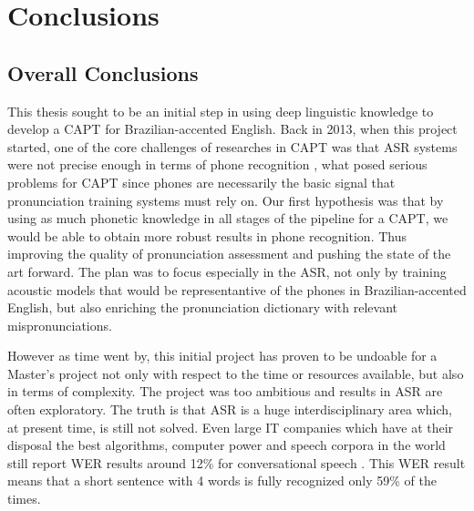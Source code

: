\chapter{Conclusions}\label{ch:conclusions}

\section*{Overall Conclusions}\label{sec:overall-conclusions}

This thesis sought to be an initial step in using deep linguistic knowledge to develop a \ac{CAPT} for Brazilian-accented English. Back in 2013, when this project started, one of the core challenges of researches in \ac{CAPT} was that \ac{ASR} systems were not precise enough in terms of phone recognition \cite{Witt2012}, what posed serious problems for \ac{CAPT} since phones are necessarily the basic signal that pronunciation training systems must rely on. Our first hypothesis was that by using as much phonetic knowledge in all stages of the pipeline for a \ac{CAPT}, we would be able to obtain more robust results in  phone recognition. Thus improving the quality of pronunciation assessment and pushing the state of the art forward. The plan was to focus especially in the \ac{ASR}, not only by training acoustic models that would be representantive of the phones in Brazilian-accented English, but also enriching the pronunciation dictionary with relevant mispronunciations. 

However as time went by, this initial project has proven to be undoable for a Master's project not only with respect to the time or resources available, but also in terms of complexity. The project was too ambitious and results in \ac{ASR} are often exploratory. The truth is that \ac{ASR} is a huge interdisciplinary area which, at present time, is still not solved. Even large IT companies which have at their disposal the best algorithms, computer power and speech corpora in the world still report \ac{WER} results around 12\% for conversational speech  \cite{Huang2014}. This \ac{WER} result means that a short sentence with 4 words is fully recognized only 59\% of the times.

